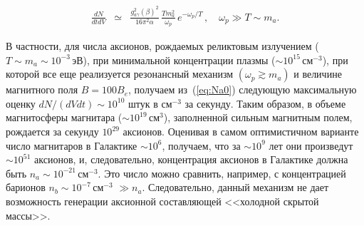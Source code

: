 %
\begin{eqnarray}
\label{eq:Na2}
\frac{dN}{dt dV} &\simeq&  \frac{g_{a\gamma}^2 (\beta)^2}{16 \pi^2 \alpha} \,
\frac{T m_a^2}{\omega_p}  \, e^{-\omega_p/T} \, , \quad \omega_p \gg T \sim m_a.
\end{eqnarray}
%



В частности, для числа аксионов, рождаемых реликтовым излучением 
($T \sim m_a \sim 10^{-3}$\,эВ), при  
 минимальной  концентрации плазмы ($\sim 10^{15}$\,см$^{-3}$), при которой все еще 
 реализуется  резонансный механизм $(\omega_p \gtrsim  m_a)$ и величине магнитного поля 
 $B=100B_e$, получаем из~(\ref{eq:Na0})  
следующую максимальную оценку $dN/(dV dt)\sim 10^{10}$ штук в см$^{-3}$ за секунду. 
 Таким образом, в объеме магнитосферы магнитара 
 ($\sim 10^{19}$\,см$^3$), заполненной сильным магнитным полем,  рождается за секунду 
 $10^{29}$ аксионов. Оценивая в самом оптимистичном варианте 
 число магнитаров в Галактике $\sim 10^6$, получаем, 
 что за $\sim 10^9$ лет они произведут $\sim 10^{51}$ аксионов, и, следовательно, 
 концентрация  аксионов в Галактике должна быть  $n_a \sim 10^{-21}$\,см$^{-3}$. Это число
 можно сравнить, например, с концентрацией барионов $n_b \sim 10^{-7}$\,см$^{-3}$ $\gg n_a$.  
Следовательно, данный механизм не дает возможность генерации аксионной составляющей <<холодной скрытой массы>>. 
 
 